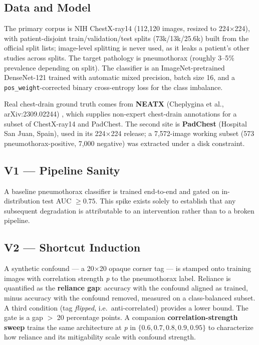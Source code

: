 \documentclass{ieeeaccess}
\begin{document}
\subsection{Data and Model}
The primary corpus is NIH ChestX-ray14 (112,120 images, resized to 224$\times$224), with patient-disjoint train/validation/test splits (73k/13k/25.6k) built from the official split lists; image-level splitting is never used, as it leaks a patient's other studies across splits. The target pathology is pneumothorax (roughly 3--5\% prevalence depending on split). The classifier is an ImageNet-pretrained DenseNet-121 trained with automatic mixed precision, batch size 16, and a \texttt{pos\_weight}-corrected binary cross-entropy loss for the class imbalance.

Real chest-drain ground truth comes from \textbf{NEATX} (Cheplygina et al., arXiv:2309.02244) \cite{neatx}, which supplies non-expert chest-drain annotations for a subset of ChestX-ray14 and PadChest. The second site is \textbf{PadChest} (Hospital San Juan, Spain), used in its 224$\times$224 release; a 7,572-image working subset (573 pneumothorax-positive, 7,000 negative) was extracted under a disk constraint.

\subsection{V1 --- Pipeline Sanity}
A baseline pneumothorax classifier is trained end-to-end and gated on in-distribution test AUC $\geq 0.75$. This spike exists solely to establish that any subsequent degradation is attributable to an intervention rather than to a broken pipeline.

\subsection{V2 --- Shortcut Induction}
A synthetic confound --- a 20$\times$20 opaque corner tag --- is stamped onto training images with correlation strength \emph{p} to the pneumothorax label. Reliance is quantified as the \textbf{reliance gap}: accuracy with the confound aligned as trained, minus accuracy with the confound removed, measured on a class-balanced subset. A third condition (tag \emph{flipped}, i.e.\ anti-correlated) provides a lower bound. The gate is a gap $>$ 20 percentage points. A companion \textbf{correlation-strength sweep} trains the same architecture at \emph{p} in $\{0.6, 0.7, 0.8, 0.9, 0.95\}$ to characterize how reliance and its mitigability scale with confound strength.
\end{document}
